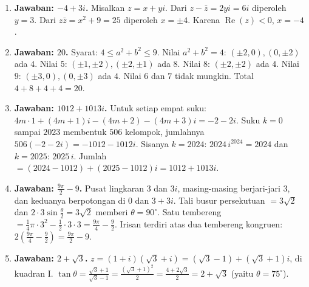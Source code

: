 \documentclass[a4paper,11pt]{article}
\newcommand{\dis}{\displaystyle}
\renewcommand{\Re}{\operatorname{Re}}
\newcounter{no}
\begin{document}
\small\begin{enumerate}[leftmargin=2em,itemsep=2pt,topsep=2pt]
\item[\textbf{1.}] \textbf{Jawaban: $-4+3i$.} Misalkan $z=x+yi$. Dari $z-\bar z=2yi=6i$ diperoleh $y=3$. Dari $z\bar z=x^2+9=25$ diperoleh $x=\pm4$. Karena $\Re(z)<0$, $x=-4$.
\item[\textbf{2.}] \textbf{Jawaban: $20$.} Syarat: $4\le a^2+b^2\le9$. Nilai $a^2+b^2=4$: $(\pm2,0),(0,\pm2)$ ada $4$. Nilai $5$: $(\pm1,\pm2),(\pm2,\pm1)$ ada $8$. Nilai $8$: $(\pm2,\pm2)$ ada $4$. Nilai $9$: $(\pm3,0),(0,\pm3)$ ada $4$. Nilai $6$ dan $7$ tidak mungkin. Total $4+8+4+4=20$.
\item[\textbf{3.}] \textbf{Jawaban: $1012+1013i$.} Untuk setiap empat suku: $4m\cdot1+(4m+1)i-(4m+2)-(4m+3)i=-2-2i$. Suku $k=0$ sampai $2023$ membentuk $506$ kelompok, jumlahnya $506(-2-2i)=-1012-1012i$. Sisanya $k=2024$: $2024\,i^{2024}=2024$ dan $k=2025$: $2025\,i$. Jumlah $=(2024-1012)+(2025-1012)i=1012+1013i$.
\item[\textbf{4.}] \textbf{Jawaban: $\dis\frac{9\pi}{2}-9$.} Pusat lingkaran $3$ dan $3i$, masing-masing berjari-jari $3$, dan keduanya berpotongan di $0$ dan $3+3i$. Tali busur persekutuan $=3\sqrt2$ dan $2\cdot3\sin\frac\theta2=3\sqrt2$ memberi $\theta=90^\circ$. Satu tembereng $=\frac14\pi\cdot3^2-\frac12\cdot3\cdot3=\frac{9\pi}4-\frac92$. Irisan terdiri atas dua tembereng kongruen: $2\left(\frac{9\pi}4-\frac92\right)=\frac{9\pi}2-9$.
\item[\textbf{5.}] \textbf{Jawaban: $2+\sqrt3$.} $z=(1+i)(\sqrt3+i)=(\sqrt3-1)+(\sqrt3+1)i$, di kuadran I. $\tan\theta=\dis\frac{\sqrt3+1}{\sqrt3-1}=\frac{(\sqrt3+1)^2}{2}=\frac{4+2\sqrt3}{2}=2+\sqrt3$ (yaitu $\theta=75^\circ$).
\end{enumerate}
\par{}\par\vspace{0.2em}
\end{document}
